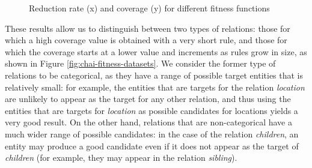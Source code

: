 \begin{figure}[htp]
    \caption{Reduction rate (x) and coverage (y) for different fitness functions}
    \label{fig:chai-points-datasets}
\end{figure}



These results allow us to distinguish between two types of relations: those for which a high coverage value is obtained with a very short rule, and those for which the coverage starts at a lower value and increments as rules grow in size, as shown in Figure \ref{fig:chai-fitness-datasets}. We consider the former type of relations to be categorical, as they have a range of possible target entities that is relatively small: for example, the entities that are targets for the relation \textit{location} are unlikely to appear as the target for any other relation, and thus using the entities that are targets for \textit{location} as possible candidates for locations yields a very good result. On the other hand, relations that are non-categorical have a much wider range of possible candidates: in the case of the relation \textit{children}, an entity may produce a good candidate even if it does not appear as the target of \textit{children} (for example, they may appear in the relation \textit{sibling}).

